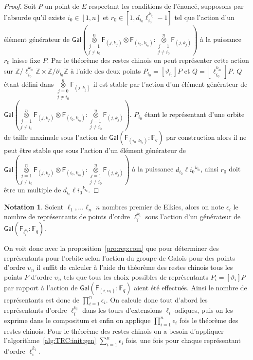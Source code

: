\documentclass[10pt,a4paper]{book}
\theoremstyle{plain}
\theoremstyle{definition}
\theoremstyle{definition}
\theoremstyle{definition}
\theoremstyle{definition}
\theoremstyle{remark}
\theoremstyle{remark}
\theoremstyle{definition}
\newtheorem{nota}[thm]{Notation}
\begin{document}
\begin{proof}
Soit $P$ un point de $E$ respectant les conditions de l'énoncé, supposons par 
l'absurde qu'il existe $i_0 \in [1,n]$ et $r_0 \in [1,d_{i_0}\ell_{i_0}^{k_{i_0}}-1]$ 
tel que l'action d'un élément générateur de 
$\mathsf{Gal}(\overset{n}{\underset{j \neq i_0}{\underset{j = 1}{\otimes}}}\mathsf{F}_{(j,k_j)}\otimes \mathsf{F}_{(i_0,k_{i_0})}:\overset{n}{\underset{j \neq i_0}{\underset{j = 1}{\otimes}}}\mathsf{F}_{(j,k_j)})$ 
à la puissance $r_0$ laisse fixe $P$. Par le théorème des restes chinois on 
peut représenter cette action sur $\mathbb{Z}/\ell_{i_0}^{k_{i_0}}\mathbb{Z} 
\times \mathbb{Z}/\vartheta_{i_0}\mathbb{Z}$
à l'aide des deux points $P_{i_0}=[\vartheta_{i_0}]P$  et 
$Q=[\ell_{i_0}^{k_{i_0}}]P$. $Q$ étant défini dans 
$\overset{n}{\underset{j \neq i_0}{\underset{j = 0}{\otimes}}} \mathsf{F}_{(j,k_j)}$ 
il est stable par l'action d'un élément générateur de 
$\mathsf{Gal}(\overset{n}{\underset{j \neq i_0}{\underset{j = 1}{\otimes}}}\mathsf{F}_{(j,k_j)}\otimes \mathsf{F}_{(i_0,k_{i_0})}:\overset{n}{\underset{j \neq i_0}{\underset{j = 1}{\otimes}}}\mathsf{F}_{(j,k_j)})$.
$P_{i_0}$ étant le représentant d'une orbite de taille maximale
sous l'action de $\mathsf{Gal}(\mathsf{F}_{(i_0,k_{i_0})}:\mathbb{F}_q)$ par 
construction alors il ne peut être stable que sous l'action d'un élément 
générateur de 
$\mathsf{Gal}(\overset{n}{\underset{j \neq i_0}{\underset{j = 1}{\otimes}}}\mathsf{F}_{(j,k_j)}\otimes \mathsf{F}_{(i_0,k_{i_0})}:\overset{n}{\underset{j \neq i_0}{\underset{j = 1}{\otimes}}}\mathsf{F}_{(j,k_j)})$
à la puissance $d_{i_0}\ell{i_0}^{k_{i_0}}$, ainsi $r_0$ doit être un multiple 
de $d_{i_0}\ell{i_0}^{k_{i_0}}$.
\end{proof}

\begin{nota}
Soient $\ell_1, \dots \ell_n$ $n$ nombres premier de Elkies, alors on note 
$\epsilon_i$ le nombre de représentants de points d'ordre $\ell_i^{k_i}$ sous 
l'action d'un générateur de $\mathsf{Gal}(\mathsf{F}_{\ell_i^{k_i}}:\mathbb{F}_q)$.
\end{nota}

On voit donc avec la proposition~\ref{pro:rep:com} que pour déterminer des 
représentants pour l'orbite selon l'action du groupe de Galois pour des points 
d'ordre $\upsilon_n$ il suffit de calculer à l'aide du théorème des 
restes chinois tous les points $P$ d'ordre $\upsilon_n$ 
tels que tous les choix possibles de représentants $P_i=[\vartheta_i]P$
par rapport à l'action de $\mathsf{Gal}(\mathsf{F}_{(i,n_i)}:\mathbb{F}_q)$
 aient été effectués. Ainsi le nombre de représentants est
 donc de $\prod_{i=1}^{n} \epsilon_i$. On calcule donc 
 tout d'abord les représentants d'ordre $\ell_i^{k_i}$ dans les tours 
 d'extensions $\ell_i$-adiques, puis on les exprime dans le compositum et enfin
 on applique $\prod_{i=1}^{n} \epsilon_i$ fois le théorème des restes chinois. 
 Pour le théorème des restes chinois on a besoin d'appliquer 
 l'algorithme~\ref{alg:TRC:init:gen} $\sum_{i=1}^{n} \epsilon_i$ fois, une fois
 pour chaque représentant d'ordre $\ell_i^{k_i}$.
  
\end{document}

